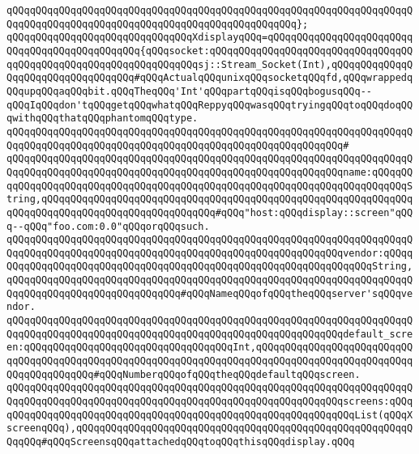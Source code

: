 \verb|qQQqqQQqqQQqqQQqqQQqqQQqqQQqqQQqqQQqqQQqqQQqqQQqqQQqqQQqqQQqqQQqqQQqqQQqqQQqqQQqqQQqqQQqqQQqqQQqqQQqqQQqqQQqqQQqqQQqqQQq};|\newline
\newline
\verb|qQQqqQQqqQQqqQQqqQQqqQQqqQQqqQQqXdisplayqQQq=qQQqqQQqqQQqqQQqqQQqqQQqqQQqqQQqqQQqqQQqqQQqqQQq{qQQqsocket:qQQqqQQqqQQqqQQqqQQqqQQqqQQqqQQqqQQqqQQqqQQqqQQqqQQqqQQqqQQqqQQqqQQqsj::Stream_Socket(Int),qQQqqQQqqQQqqQQqqQQqqQQqqQQqqQQqqQQq#qQQqActualqQQqunixqQQqsocketqQQqfd,qQQqwrappedqQQqupqQQqaqQQqbit.qQQqTheqQQq'Int'qQQqpartqQQqisqQQqbogusqQQq--qQQqIqQQqdon'tqQQqgetqQQqwhatqQQqReppyqQQqwasqQQqtryingqQQqtoqQQqdoqQQqwithqQQqthatqQQqphantomqQQqtype.|\newline
\verb|qQQqqQQqqQQqqQQqqQQqqQQqqQQqqQQqqQQqqQQqqQQqqQQqqQQqqQQqqQQqqQQqqQQqqQQqqQQqqQQqqQQqqQQqqQQqqQQqqQQqqQQqqQQqqQQqqQQqqQQqqQQqqQQq#|\newline
\verb|qQQqqQQqqQQqqQQqqQQqqQQqqQQqqQQqqQQqqQQqqQQqqQQqqQQqqQQqqQQqqQQqqQQqqQQqqQQqqQQqqQQqqQQqqQQqqQQqqQQqqQQqqQQqqQQqqQQqqQQqqQQqqQQqname:qQQqqQQqqQQqqQQqqQQqqQQqqQQqqQQqqQQqqQQqqQQqqQQqqQQqqQQqqQQqqQQqqQQqqQQqqQQqString,qQQqqQQqqQQqqQQqqQQqqQQqqQQqqQQqqQQqqQQqqQQqqQQqqQQqqQQqqQQqqQQqqQQqqQQqqQQqqQQqqQQqqQQqqQQqqQQqqQQq#qQQq"host:qQQqdisplay::screen"qQQq--qQQq"foo.com:0.0"qQQqorqQQqsuch.|\newline
\verb|qQQqqQQqqQQqqQQqqQQqqQQqqQQqqQQqqQQqqQQqqQQqqQQqqQQqqQQqqQQqqQQqqQQqqQQqqQQqqQQqqQQqqQQqqQQqqQQqqQQqqQQqqQQqqQQqqQQqqQQqqQQqqQQqvendor:qQQqqQQqqQQqqQQqqQQqqQQqqQQqqQQqqQQqqQQqqQQqqQQqqQQqqQQqqQQqqQQqqQQqString,qQQqqQQqqQQqqQQqqQQqqQQqqQQqqQQqqQQqqQQqqQQqqQQqqQQqqQQqqQQqqQQqqQQqqQQqqQQqqQQqqQQqqQQqqQQqqQQqqQQq#qQQqNameqQQqofqQQqtheqQQqserver'sqQQqvendor.|\newline
\newline
\verb|qQQqqQQqqQQqqQQqqQQqqQQqqQQqqQQqqQQqqQQqqQQqqQQqqQQqqQQqqQQqqQQqqQQqqQQqqQQqqQQqqQQqqQQqqQQqqQQqqQQqqQQqqQQqqQQqqQQqqQQqqQQqqQQqdefault_screen:qQQqqQQqqQQqqQQqqQQqqQQqqQQqqQQqqQQqInt,qQQqqQQqqQQqqQQqqQQqqQQqqQQqqQQqqQQqqQQqqQQqqQQqqQQqqQQqqQQqqQQqqQQqqQQqqQQqqQQqqQQqqQQqqQQqqQQqqQQqqQQqqQQqqQQq#qQQqNumberqQQqofqQQqtheqQQqdefaultqQQqscreen.|\newline
\verb|qQQqqQQqqQQqqQQqqQQqqQQqqQQqqQQqqQQqqQQqqQQqqQQqqQQqqQQqqQQqqQQqqQQqqQQqqQQqqQQqqQQqqQQqqQQqqQQqqQQqqQQqqQQqqQQqqQQqqQQqqQQqqQQqscreens:qQQqqQQqqQQqqQQqqQQqqQQqqQQqqQQqqQQqqQQqqQQqqQQqqQQqqQQqqQQqqQQqList(qQQqXscreenqQQq),qQQqqQQqqQQqqQQqqQQqqQQqqQQqqQQqqQQqqQQqqQQqqQQqqQQqqQQqqQQqqQQq#qQQqScreensqQQqattachedqQQqtoqQQqthisqQQqdisplay.qQQq|\newline
